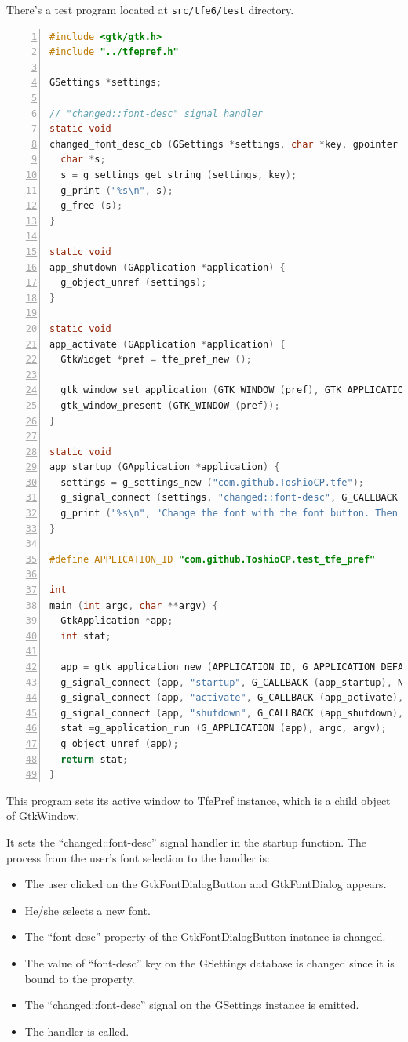 There's a test program located at
\passthrough{\lstinline!src/tfe6/test!} directory.

\begin{lstlisting}[language=C, numbers=left]
#include <gtk/gtk.h>
#include "../tfepref.h"

GSettings *settings;

// "changed::font-desc" signal handler
static void
changed_font_desc_cb (GSettings *settings, char *key, gpointer user_data) {
  char *s;
  s = g_settings_get_string (settings, key);
  g_print ("%s\n", s);
  g_free (s);
}

static void
app_shutdown (GApplication *application) {
  g_object_unref (settings);
}

static void
app_activate (GApplication *application) {
  GtkWidget *pref = tfe_pref_new ();

  gtk_window_set_application (GTK_WINDOW (pref), GTK_APPLICATION (application));
  gtk_window_present (GTK_WINDOW (pref));
}

static void
app_startup (GApplication *application) {
  settings = g_settings_new ("com.github.ToshioCP.tfe");
  g_signal_connect (settings, "changed::font-desc", G_CALLBACK (changed_font_desc_cb), NULL);
  g_print ("%s\n", "Change the font with the font button. Then the new font will be printed out.\n");
}

#define APPLICATION_ID "com.github.ToshioCP.test_tfe_pref"

int
main (int argc, char **argv) {
  GtkApplication *app;
  int stat;

  app = gtk_application_new (APPLICATION_ID, G_APPLICATION_DEFAULT_FLAGS);
  g_signal_connect (app, "startup", G_CALLBACK (app_startup), NULL);
  g_signal_connect (app, "activate", G_CALLBACK (app_activate), NULL);
  g_signal_connect (app, "shutdown", G_CALLBACK (app_shutdown), NULL);
  stat =g_application_run (G_APPLICATION (app), argc, argv);
  g_object_unref (app);
  return stat;
}
\end{lstlisting}

This program sets its active window to TfePref instance, which is a
child object of GtkWindow.

It sets the ``changed::font-desc'' signal handler in the startup
function. The process from the user's font selection to the handler is:

\begin{itemize}
\tightlist
\item
  The user clicked on the GtkFontDialogButton and GtkFontDialog appears.
\item
  He/she selects a new font.
\item
  The ``font-desc'' property of the GtkFontDialogButton instance is
  changed.
\item
  The value of ``font-desc'' key on the GSettings database is changed
  since it is bound to the property.
\item
  The ``changed::font-desc'' signal on the GSettings instance is
  emitted.
\item
  The handler is called.
\end{itemize}

